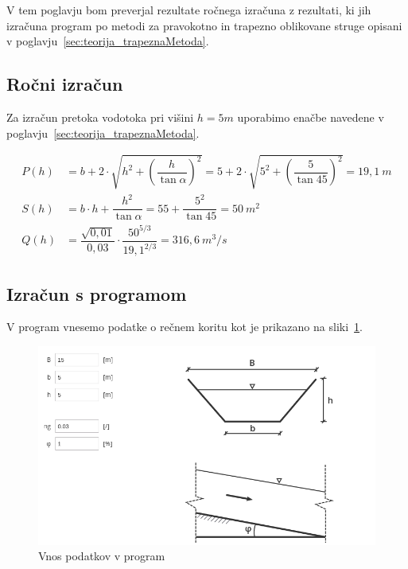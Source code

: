 V tem poglavju bom preverjal rezultate ročnega izračuna z rezultati, ki jih izračuna program po metodi za pravokotno in trapezno oblikovane struge opisani v poglavju~\ref{sec:teorija_trapeznaMetoda}.


\subsection{Ročni izračun}
Za izračun pretoka vodotoka pri višini $h=5m$ uporabimo enačbe navedene v poglavju~\ref{sec:teorija_trapeznaMetoda}.
\begin{ceqn}
	\begin{align}
	P(h)&= b + 2 \cdot \sqrt{h^2 + \left(\dfrac{h} {\tan\alpha} \right)^{2}} = 5 + 2 \cdot \sqrt{5^2 + \left(\dfrac{5} {\tan 45} \right)^{2}} = 19,1~m \\
	S(h)&= b \cdot h +  \dfrac{h^{2}}{\tan{\alpha}}   = 5  5 +  \dfrac{5^{2}}{\tan{45}}= 50~m^2 \\
	Q(h)&= \dfrac{\sqrt{0,01}}{0,03} \cdot \dfrac{50^{5/3}}{19,1^{2/3}} = 316,6~m^3/s
	\end{align}
\end{ceqn}


\subsection{Izračun s programom}
V program vnesemo podatke o rečnem koritu kot je prikazano na sliki~\ref{fig:trapeznaMetoda_vnosPodatkov}.

\begin{figure}[ht!]
	\begin{centering}
		\includegraphics[width=\textwidth]{slike/izracuni/trapeznaStruga.png}		
		\caption{Vnos podatkov v program}\label{fig:trapeznaMetoda_vnosPodatkov}
	\end{centering}
\end{figure}


